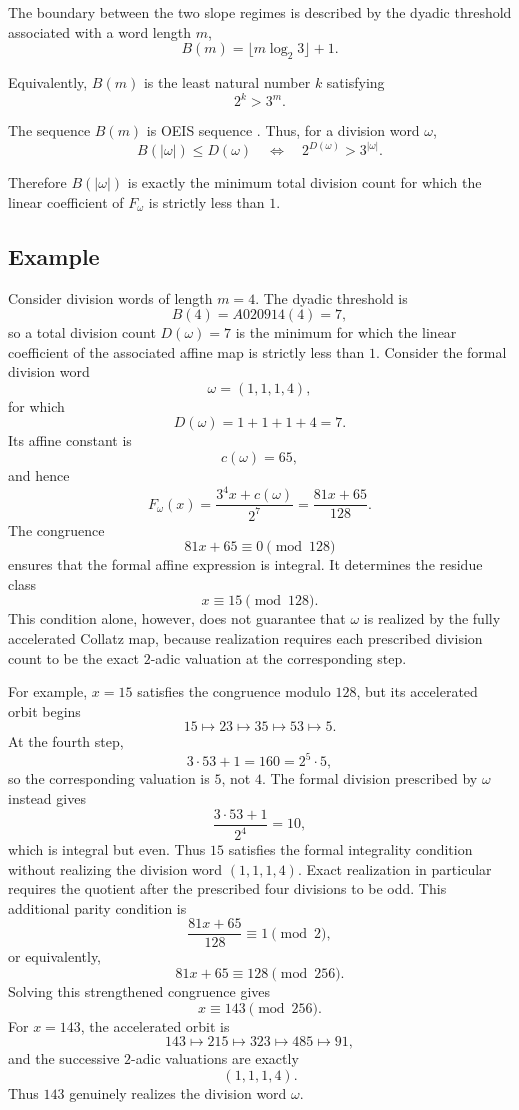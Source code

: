 \documentclass[12pt, oneside]{article}
\numberwithin{equation}{section}
\theoremstyle{definition}
\theoremstyle{plain}
\theoremstyle{remark}
\begin{document}
The boundary between the two slope regimes is described by the dyadic
threshold associated with a word length \(m\),
\[
B(m)=\lfloor m\log_2 3\rfloor+1.
\]

Equivalently, \(B(m)\) is the least natural number \(k\) satisfying
\[
2^k>3^m.
\]

The sequence \(B(m)\) is OEIS sequence . Thus,
for a division word \(\omega\),
\[
B(|\omega|)\le D(\omega)
\quad\Longleftrightarrow\quad
2^{D(\omega)}>3^{|\omega|}.\]

Therefore \(B(|\omega|)\) is exactly the minimum total division count for
which the linear coefficient of \(F_\omega\) is strictly less than \(1\).

\subsection{Example}

Consider division words of length \(m=4\). The dyadic threshold is
\[
B(4)=A020914(4)=7,
\]
so a total division count \(D(\omega)=7\) is the minimum for which the
linear coefficient of the associated affine map is strictly less than \(1\). 
Consider the formal division word
\[
\omega=(1,1,1,4),
\]
for which
\[
D(\omega)=1+1+1+4=7.
\]
Its affine constant is
\[
c(\omega)=65,
\]
and hence
\[
F_\omega(x) = \frac{3^4x+c(\omega)}{2^7} = \frac{81x+65}{128}.
\]
The congruence
\[
81x+65\equiv0\pmod{128}
\]
ensures that the formal affine expression is integral. It determines the
residue class
\[
x\equiv15\pmod{128}.
\]
This condition alone, however, does not guarantee that \(\omega\) is
realized by the fully accelerated Collatz map, because realization requires
each prescribed division count to be the exact \(2\)-adic valuation at the
corresponding step.

For example, \(x=15\) satisfies the congruence modulo \(128\), but its
accelerated orbit begins
\[
15\longmapsto23\longmapsto35\longmapsto53\longmapsto5.
\]
At the fourth step,
\[
3\cdot53+1=160=2^5\cdot5,
\]
so the corresponding valuation is \(5\), not \(4\). The formal division
prescribed by \(\omega\) instead gives
\[
\frac{3\cdot53+1}{2^4}=10,
\]
which is integral but even. Thus \(15\) satisfies the formal integrality
condition without realizing the division word \((1,1,1,4)\). Exact
realization in particular requires the quotient after the prescribed four
divisions to be odd. This additional parity condition is
\[
\frac{81x+65}{128}\equiv1\pmod2,
\]
or equivalently,
\[
81x+65\equiv128\pmod{256}.
\]
Solving this strengthened congruence gives
\[
x\equiv143\pmod{256}.
\]
For \(x=143\), the accelerated orbit is
\[
143\longmapsto215\longmapsto323\longmapsto485\longmapsto91,
\]
and the successive \(2\)-adic valuations are exactly
\[
(1,1,1,4).
\]
Thus \(143\) genuinely realizes the division word \(\omega\).
\end{document}
